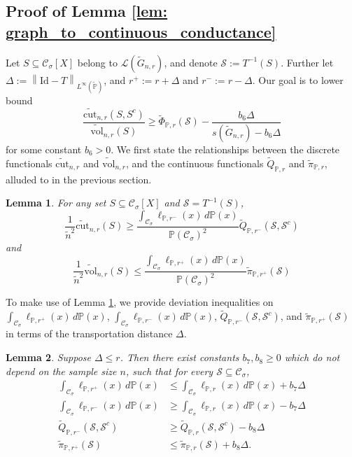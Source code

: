 \documentclass[11pt,twoside]{article}
\newtheorem{lemma}{Lemma}
\theoremstyle{definition}
\newcommand{\vol}{\mathrm{vol}}
\newcommand{\cut}{\mathrm{cut}}
\newcommand{\norm}[1]{\left\lVert#1\right\rVert}
\newcommand{\1}{\mathbbm{1}}
\newcommand{\Xbf}{X}
\newcommand{\Pbb}{\mathbb{P}}
\newcommand{\Sset}{\mathcal{S}}
\newcommand{\Cset}{\mathcal{C}}
\newcommand{\Csig}{\Cset_{\sigma}}
\begin{document}
\subsection{Proof of Lemma \ref{lem: graph_to_continuous_conductance}}
Let $S \subseteq \Csig[\Xbf]$ belong to $\mathcal{L}(\widetilde{G}_{n,r})$, and denote $\Sset := T^{-1}(S)$. Further let $\varDelta := \norm{\mathrm{Id} - T}_{L^{\infty}(\widetilde{\Pbb})}$, and $r^{+} := r + \varDelta$ and $r^{-} := r - \varDelta$. Our goal is to lower bound
\begin{equation*}
\frac{\widetilde{\cut}_{n,r}(S,S^c)}{\widetilde{\vol}_{n,r}(S)} \geq \widetilde{\Phi}_{\Pbb,r}(\Sset) - \frac{b_6\varDelta}{s(\widetilde{G}_{n,r}) - b_6 \varDelta}
\end{equation*}
for some constant $b_6 > 0$. We first state the relationships between the discrete functionals $\widetilde{\cut}_{n,r}$ and $\widetilde{\vol}_{n,r}$, and the continuous functionals $\widetilde{Q}_{\Pbb,r}$ and $\widetilde{\pi}_{\Pbb,r}$, alluded to in the previous section.
\begin{lemma}
	\label{lem: cut_volume}
	For any set $S \subseteq \Csig[\Xbf]$ and $\mathcal{S} = T^{-1}(S)$, 
	\begin{equation}
	\label{eqn: cut}
	\frac{1}{\widetilde{n}^2}\widetilde{\cut}_{n,r}(S) \geq \frac{\int_{\Csig} \ell_{\Pbb,r^-}(x) \,d\Pbb(x)}{\Pbb(\Csig)^2} \widetilde{Q}_{\Pbb,r^-}(\Sset, \Sset^c)
	\end{equation}
	and 
	\begin{equation}
	\label{eqn: volume}
	\frac{1}{\widetilde{n}^2}\widetilde{\vol}_{n,r}(S) \leq \frac{\int_{\Csig} \ell_{\Pbb,r^+}(x) \,d\Pbb(x)}{\Pbb(\Csig)^2} \widetilde{\pi}_{\Pbb,r^+}(\Sset)
	\end{equation}
\end{lemma}
To make use of Lemma \ref{lem: cut_volume}, we provide deviation inequalities on $\int_{\Csig} \ell_{\Pbb,r^+}(x) \,d\Pbb(x)$, $\int_{\Csig} \ell_{\Pbb,r^-}(x) \,d\Pbb(x)$, $\widetilde{Q}_{\Pbb,r^-}(\Sset, \Sset^c)$, and $\widetilde{\pi}_{\Pbb,r^+}(\Sset)$ in terms of the transportation distance $\varDelta$.
\begin{lemma}
	\label{lem: deviation_transportation_distance}
	Suppose $\Delta \leq r$. Then there exist constants $b_7,b_8 \geq 0$ which do not depend on the sample size $n$, such that for every $\Sset \subseteq \Csig$,
	\begin{align*}
	\int_{\Csig} \ell_{\Pbb,r^+}(x) \,d\Pbb(x) & \leq \int_{\Csig} \ell_{\Pbb,r}(x) \,d\Pbb(x) + b_7 \varDelta \\
	\int_{\Csig} \ell_{\Pbb,r^-}(x) \,d\Pbb(x) & \geq \int_{\Csig} \ell_{\Pbb,r}(x) \,d\Pbb(x) - b_7 \varDelta \\
	\widetilde{Q}_{\Pbb,r^-}(\Sset, \Sset^c) & \geq \widetilde{Q}_{\Pbb,r}(\Sset, \Sset^c) - b_8 \varDelta \\
	\widetilde{\pi}_{\Pbb,r^+}(\Sset) & \leq \widetilde{\pi}_{\Pbb,r}(\Sset) + b_8 \varDelta.
	\end{align*}
\end{lemma}
\end{document}
